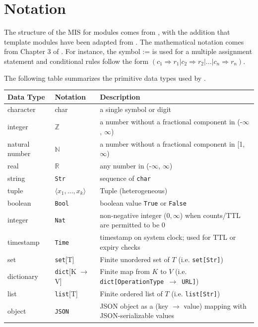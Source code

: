 \documentclass[12pt, titlepage]{article}
\begin{document}
\section{Notation}

The structure of the MIS for modules comes from \citet{HoffmanAndStrooper1995},
with the addition that template modules have been adapted from
\cite{GhezziEtAl2003}.  The mathematical notation comes from Chapter 3 of
\citet{HoffmanAndStrooper1995}.  For instance, the symbol := is used for a
multiple assignment statement and conditional rules follow the form $(c_1
\Rightarrow r_1 | c_2 \Rightarrow r_2 | ... | c_n \Rightarrow r_n )$.

The following table summarizes the primitive data types used by \progname. 

\begin{center}
\renewcommand{\arraystretch}{1.2}
\noindent 
\begin{tabular}{l l p{7.5cm}} 
\toprule 
\textbf{Data Type} & \textbf{Notation} & \textbf{Description}\\ 
\midrule
character & char & a single symbol or digit\\
integer & $\mathbb{Z}$ & a number without a fractional component in (-$\infty$, $\infty$) \\
natural number & $\mathbb{N}$ & a number without a fractional component in [1, $\infty$) \\
real & $\mathbb{R}$ & any number in (-$\infty$, $\infty$)\\
string & \texttt{Str} & sequence of \texttt{char} \\
tuple & \(\langle x_1,\ldots,x_k\rangle\) & Tuple (heterogeneous) \\
boolean &\texttt{Bool} & boolean value \texttt{True} or \texttt{False} \\
integer & \texttt{Nat} & non-negative integer (\(0,\infty\)) when counts/TTL are permitted to be \(0\) \\
timestamp & \texttt{Time} & timestamp on system clock; used for TTL or expiry checks \\
set & \texttt{set}[T] & Finite unordered set of \(T\) (i.e. \texttt{set[Str]}) \\
dictionary & \texttt{dict}[K \(\to\) V] & Finite map from \(K\) to \(V\) (i.e. \texttt{dict[OperationType \(\to\) URL]}) \\
list & \texttt{list}[T] & Finite ordered list of \(T\) (i.e. \texttt{list[Str]}) \\
object & \texttt{JSON} & JSON object as a (key \(\to\) value) mapping with JSON-serializable values \\

\end{tabular}
\end{center}
\end{document}
